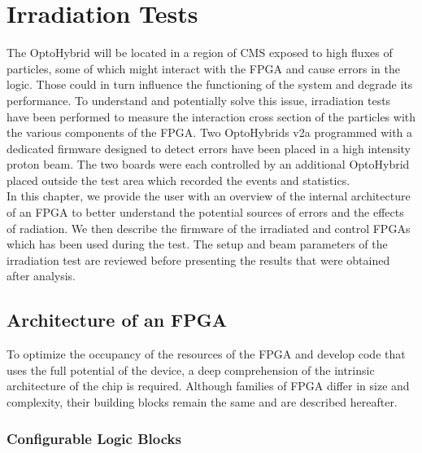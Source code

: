 \chapter{Irradiation Tests}
\label{chap:II-5-irradiation}

  The OptoHybrid will be located in a region of CMS exposed to high fluxes of particles, some of which might interact with the FPGA and cause errors in the logic. Those could in turn influence the functioning of the system and degrade its performance. To understand and potentially solve this issue, irradiation tests have been performed to measure the interaction cross section of the particles with the various components of the FPGA. Two OptoHybrids v2a programmed with a dedicated firmware designed to detect errors have been placed in a high intensity proton beam. The two boards were each controlled by an additional OptoHybrid placed outside the test area which recorded the events and statistics. \\

  In this chapter, we provide the user with an overview of the internal architecture of an FPGA to better understand the potential sources of errors and the effects of radiation. We then describe the firmware of the irradiated and control FPGAs which has been used during the test. The setup and beam parameters of the irradiation test are reviewed before presenting the results that were obtained after analysis.

  \section{Architecture of an FPGA}

    To optimize the occupancy of the resources of the FPGA and develop code that uses the full potential of the device, a deep comprehension of the intrinsic architecture of the chip is required. Although families of FPGA differ in size and complexity, their building blocks remain the same and are described hereafter.

    \subsection{Configurable Logic Blocks}

